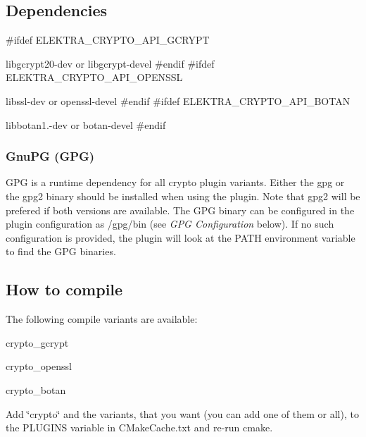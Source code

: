 \subsection*{Dependencies}

\#ifdef E\+L\+E\+K\+T\+R\+A\+\_\+\+C\+R\+Y\+P\+T\+O\+\_\+\+A\+P\+I\+\_\+\+G\+C\+R\+Y\+P\+T
\begin{DoxyItemize}
\item {\ttfamily libgcrypt20-\/dev} or {\ttfamily libgcrypt-\/devel} \#endif \#ifdef E\+L\+E\+K\+T\+R\+A\+\_\+\+C\+R\+Y\+P\+T\+O\+\_\+\+A\+P\+I\+\_\+\+O\+P\+E\+N\+S\+S\+L
\item {\ttfamily libssl-\/dev} or {\ttfamily openssl-\/devel} \#endif \#ifdef E\+L\+E\+K\+T\+R\+A\+\_\+\+C\+R\+Y\+P\+T\+O\+\_\+\+A\+P\+I\+\_\+\+B\+O\+T\+A\+N
\item {\ttfamily libbotan1.-\/dev} or {\ttfamily botan-\/devel} \#endif
\end{DoxyItemize}

\subsubsection*{Gnu\+P\+G (G\+P\+G)}

G\+P\+G is a runtime dependency for all crypto plugin variants. Either the {\ttfamily gpg} or the {\ttfamily gpg2} binary should be installed when using the plugin. Note that {\ttfamily gpg2} will be prefered if both versions are available. The G\+P\+G binary can be configured in the plugin configuration as {\ttfamily /gpg/bin} (see {\itshape G\+P\+G Configuration} below). If no such configuration is provided, the plugin will look at the P\+A\+T\+H environment variable to find the G\+P\+G binaries.

\subsection*{How to compile}

The following compile variants are available\+:


\begin{DoxyEnumerate}
\item crypto\+\_\+gcrypt
\item crypto\+\_\+openssl
\item crypto\+\_\+botan
\end{DoxyEnumerate}

Add \char`\"{}crypto\char`\"{} and the variants, that you want (you can add one of them or all), to the {\ttfamily P\+L\+U\+G\+I\+N\+S} variable in {\ttfamily C\+Make\+Cache.\+txt} and re-\/run {\ttfamily cmake}.

